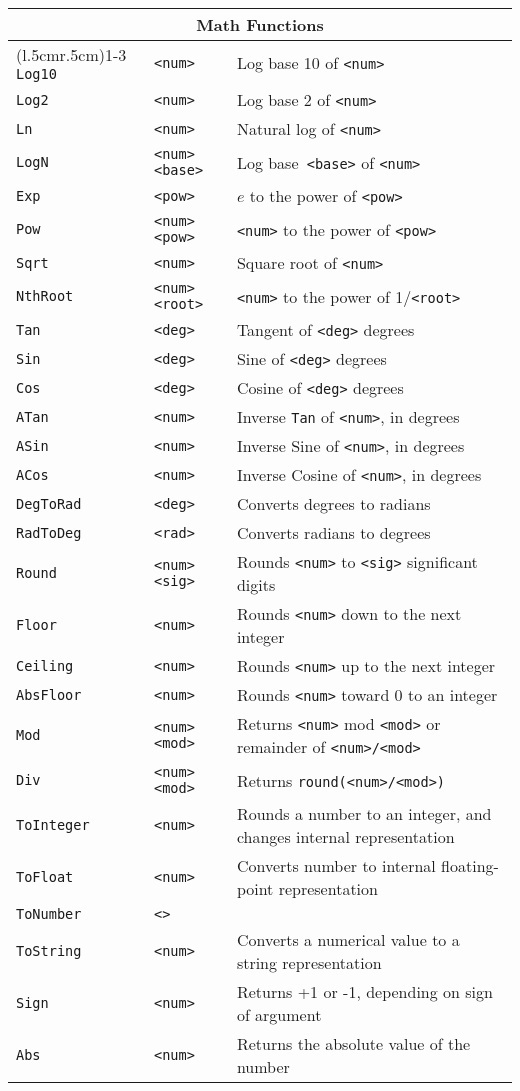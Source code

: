 \begin{longtable}{p{3cm}p{3cm}p{6cm}}
\multicolumn{3}{c}{\textbf{Math Functions}}\\ 
\cmidrule(l{.5cm}r{.5cm}){1-3} 
\verb+Log10+ &\verb+<num>+ &Log base 10 of \verb+<num>+\\ 
\verb+Log2+ &\verb+<num>+ &Log base 2 of \verb+<num>+ \\ 
\verb+Ln+ &\verb+<num>+ &Natural log of \verb+<num>+\\ 
\verb+LogN+ &\verb+<num> <base>+ &Log base\verb+ <base>+ of \verb+<num>+\\ 
\verb+Exp+ &\verb+<pow>+ &$e$ to the power of \verb+<pow>+ \\ 
\verb+Pow+ &\verb+<num> <pow>+ &\verb+<num>+ to the power of \verb+<pow>+\\ 
\verb+Sqrt+ &\verb+<num>+ &Square root of \verb+<num>+\\ 
\verb+NthRoot+ &\verb+<num> <root>+ &\verb+<num>+ to the power of 1/\verb+<root>+\\ 
\verb+Tan+ &\verb+<deg>+ &Tangent of \verb+<deg>+ degrees \\ 
\verb+Sin+ &\verb+<deg>+ &Sine of \verb+<deg>+ degrees \\ 
\verb+Cos+ &\verb+<deg>+ &Cosine of \verb+<deg>+ degrees \\ 
\verb+ATan+ &\verb+<num>+ &Inverse \verb+Tan+ of \verb+<num>+, in degrees\\ 
\verb+ASin+ &\verb+<num>+ &Inverse Sine of \verb+<num>+, in degrees\\ 
\verb+ACos+ &\verb+<num>+ &Inverse Cosine of \verb+<num>+, in degrees\\ 
\verb+DegToRad+ &\verb+<deg>+ &Converts degrees to radians\\ 
\verb+RadToDeg+ &\verb+<rad>+ &Converts radians to degrees\\ 
\verb+Round+ &\verb+<num> <sig>+ &Rounds \verb+<num>+ to \verb+<sig>+ significant digits\\ 
\verb+Floor+ &\verb+<num>+ &Rounds \verb+<num>+ down to the next integer\\ 
\verb+Ceiling+ &\verb+<num>+ &Rounds \verb+<num>+ up to the next integer\\ 
\verb+AbsFloor+ &\verb+<num>+ &Rounds \verb+<num>+ toward 0 to an integer\\ 
\verb+Mod+ &\verb+<num> <mod>+ &Returns \verb+<num>+ mod \verb+<mod>+ or remainder of \verb+<num>/<mod>+ \\ 
\verb+Div+ &\verb+<num> <mod>+ &Returns \verb+round(<num>/<mod>)+ \\ 
\verb+ToInteger+ &\verb+<num>+ &Rounds a number to an integer, and changes internal representation\\ 
\verb+ToFloat+ &\verb+<num>+ &Converts number to internal floating-point representation\\ 
\verb+ToNumber+ &\verb+<>+ & \\ 
\verb+ToString+ &\verb+<num>+ &Converts a numerical value to a string representation\\ 
\verb+Sign+ &\verb+<num>+ &Returns +1 or -1, depending on sign of argument\\ 
\verb+Abs+ &\verb+<num>+ &Returns the absolute value of the number\\ 


\end{longtable}
